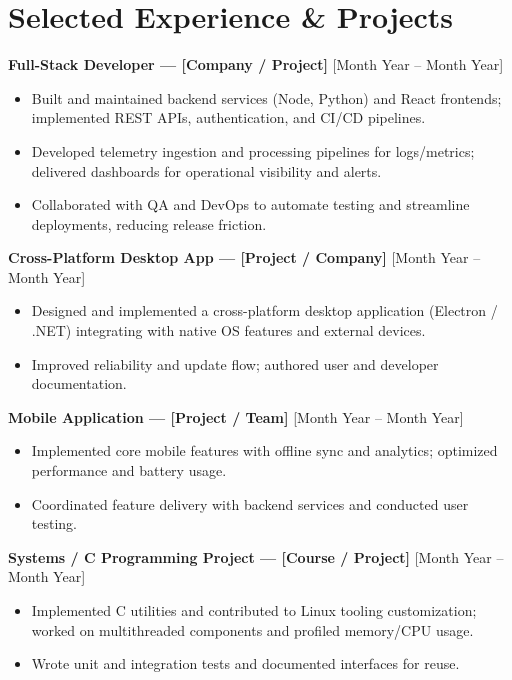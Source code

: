\documentclass[11pt]{article}
\begin{document}
\section*{Selected Experience \& Projects}
\textbf{Full-Stack Developer — [Company / Project]} \hfill [Month Year -- Month Year] \\
\begin{itemize}
  \item Built and maintained backend services (Node, Python) and React frontends; implemented REST APIs, authentication, and CI/CD pipelines.
  \item Developed telemetry ingestion and processing pipelines for logs/metrics; delivered dashboards for operational visibility and alerts.
  \item Collaborated with QA and DevOps to automate testing and streamline deployments, reducing release friction.
\end{itemize}

\textbf{Cross-Platform Desktop App — [Project / Company]} \hfill [Month Year -- Month Year] \\
\begin{itemize}
  \item Designed and implemented a cross-platform desktop application (Electron / .NET) integrating with native OS features and external devices.
  \item Improved reliability and update flow; authored user and developer documentation.
\end{itemize}

\textbf{Mobile Application — [Project / Team]} \hfill [Month Year -- Month Year] \\
\begin{itemize}
  \item Implemented core mobile features with offline sync and analytics; optimized performance and battery usage.
  \item Coordinated feature delivery with backend services and conducted user testing.
\end{itemize}

\textbf{Systems / C Programming Project — [Course / Project]} \hfill [Month Year -- Month Year] \\
\begin{itemize}
  \item Implemented C utilities and contributed to Linux tooling customization; worked on multithreaded components and profiled memory/CPU usage.
  \item Wrote unit and integration tests and documented interfaces for reuse.
\end{itemize}
\end{document}
